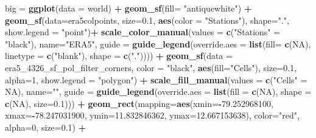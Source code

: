 \documentclass[12pt,oneside]{reedthesis}
\newenvironment{Shaded}{\begin{snugshade}}{\end{snugshade}}
\newcommand{\DataTypeTok}[1]{\textcolor[rgb]{0.13,0.29,0.53}{#1}}
\newcommand{\DecValTok}[1]{\textcolor[rgb]{0.00,0.00,0.81}{#1}}
\newcommand{\FloatTok}[1]{\textcolor[rgb]{0.00,0.00,0.81}{#1}}
\newcommand{\KeywordTok}[1]{\textcolor[rgb]{0.13,0.29,0.53}{\textbf{#1}}}
\newcommand{\NormalTok}[1]{#1}
\newcommand{\OperatorTok}[1]{\textcolor[rgb]{0.81,0.36,0.00}{\textbf{#1}}}
\newcommand{\OtherTok}[1]{\textcolor[rgb]{0.56,0.35,0.01}{#1}}
\newcommand{\StringTok}[1]{\textcolor[rgb]{0.31,0.60,0.02}{#1}}
\begin{document}
\begin{Shaded}
\begin{Highlighting}[]
\NormalTok{big =}\StringTok{ }\KeywordTok{ggplot}\NormalTok{(}\DataTypeTok{data =}\NormalTok{ world) }\OperatorTok{+}\StringTok{ }
\StringTok{  }\KeywordTok{geom_sf}\NormalTok{(}\DataTypeTok{fill=} \StringTok{"antiquewhite"}\NormalTok{) }\OperatorTok{+}
\StringTok{  }\KeywordTok{geom_sf}\NormalTok{(}\DataTypeTok{data=}\NormalTok{era5colpoints, }\DataTypeTok{size=}\FloatTok{0.1}\NormalTok{, }\KeywordTok{aes}\NormalTok{(}\DataTypeTok{color =} \StringTok{"Stations"}\NormalTok{), }\DataTypeTok{shape=}\StringTok{"."}\NormalTok{,  }\DataTypeTok{show.legend =} \StringTok{"point"}\NormalTok{)}\OperatorTok{+}
\StringTok{  }\KeywordTok{scale_color_manual}\NormalTok{(}\DataTypeTok{values =} \KeywordTok{c}\NormalTok{(}\StringTok{"Stations"}\NormalTok{ =}\StringTok{ "black"}\NormalTok{), }\DataTypeTok{name=}\StringTok{"ERA5"}\NormalTok{, }\DataTypeTok{guide =} \KeywordTok{guide_legend}\NormalTok{(}\DataTypeTok{override.aes =} \KeywordTok{list}\NormalTok{(}\DataTypeTok{fill=} \KeywordTok{c}\NormalTok{(}\OtherTok{NA}\NormalTok{), }\DataTypeTok{linetype =} \KeywordTok{c}\NormalTok{(}\StringTok{"blank"}\NormalTok{), }
   \DataTypeTok{shape =} \KeywordTok{c}\NormalTok{(}\StringTok{"."}\NormalTok{)))) }\OperatorTok{+}
\StringTok{  }\KeywordTok{geom_sf}\NormalTok{(}\DataTypeTok{data =}\NormalTok{ era5_}\DecValTok{4326}\NormalTok{_sf_pol_filter_corners, }\DataTypeTok{color =} \StringTok{"black"}\NormalTok{, }\KeywordTok{aes}\NormalTok{(}\DataTypeTok{fill=}\StringTok{"Cells"}\NormalTok{), }\DataTypeTok{size=}\FloatTok{0.1}\NormalTok{, }\DataTypeTok{alpha=}\DecValTok{1}\NormalTok{, }\DataTypeTok{show.legend =} \StringTok{"polygon"}\NormalTok{) }\OperatorTok{+}
\StringTok{  }\KeywordTok{scale_fill_manual}\NormalTok{(}\DataTypeTok{values =} \KeywordTok{c}\NormalTok{(}\StringTok{"Cells"}\NormalTok{ =}\StringTok{ }\OtherTok{NA}\NormalTok{), }\DataTypeTok{name=}\StringTok{""}\NormalTok{, }\DataTypeTok{guide =} \KeywordTok{guide_legend}\NormalTok{(}\DataTypeTok{override.aes =} \KeywordTok{list}\NormalTok{(}\DataTypeTok{fill =} \KeywordTok{c}\NormalTok{(}\OtherTok{NA}\NormalTok{), }\DataTypeTok{shape =} \KeywordTok{c}\NormalTok{(}\OtherTok{NA}\NormalTok{), }\DataTypeTok{size=}\FloatTok{0.1}\NormalTok{))) }\OperatorTok{+}
\StringTok{  }\KeywordTok{geom_rect}\NormalTok{(}\DataTypeTok{mapping=}\KeywordTok{aes}\NormalTok{(}\DataTypeTok{xmin=}\OperatorTok{-}\FloatTok{79.252968100}\NormalTok{, }\DataTypeTok{xmax=}\OperatorTok{-}\FloatTok{78.247031900}\NormalTok{, }\DataTypeTok{ymin=}\FloatTok{11.832846362}\NormalTok{, }\DataTypeTok{ymax=}\FloatTok{12.667153638}\NormalTok{), }\DataTypeTok{color=}\StringTok{"red"}\NormalTok{, }\DataTypeTok{alpha=}\DecValTok{0}\NormalTok{, }\DataTypeTok{size=}\FloatTok{0.1}\NormalTok{) }\OperatorTok{+}

\end{Highlighting}
\end{Shaded}
\end{document}
